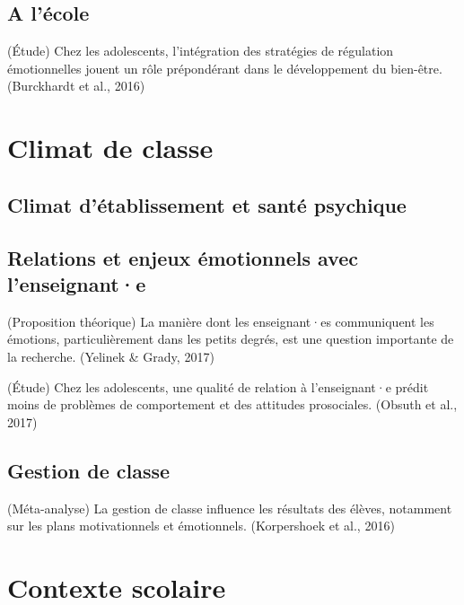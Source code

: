 \documentclass[
  french,
]{article}
\begin{document}
\hypertarget{a-luxe9cole}{%
\subsection{A l'école}\label{a-luxe9cole}}

(Étude) Chez les adolescents, l'intégration des stratégies de régulation émotionnelles jouent un rôle prépondérant dans le développement du bien-être. (Burckhardt et al., 2016)

\hypertarget{climat-de-classe}{%
\section{Climat de classe}\label{climat-de-classe}}

\hypertarget{climat-duxe9tablissement-et-santuxe9-psychique}{%
\subsection{Climat d'établissement et santé psychique}\label{climat-duxe9tablissement-et-santuxe9-psychique}}

\hypertarget{relations-et-enjeux-uxe9motionnels-avec-lenseignante}{%
\subsection{Relations et enjeux émotionnels avec l'enseignant·e}\label{relations-et-enjeux-uxe9motionnels-avec-lenseignante}}

(Proposition théorique) La manière dont les enseignant·es communiquent les émotions, particulièrement dans les petits degrés, est une question importante de la recherche. (Yelinek \& Grady, 2017)

(Étude) Chez les adolescents, une qualité de relation à l'enseignant·e prédit moins de problèmes de comportement et des attitudes prosociales. (Obsuth et al., 2017)

\hypertarget{gestion-de-classe}{%
\subsection{Gestion de classe}\label{gestion-de-classe}}

(Méta-analyse) La gestion de classe influence les résultats des élèves, notamment sur les plans motivationnels et émotionnels. (Korpershoek et al., 2016)

\hypertarget{contexte-scolaire}{%
\section{Contexte scolaire}\label{contexte-scolaire}}
\end{document}
